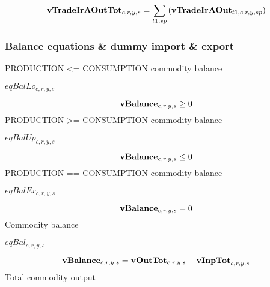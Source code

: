 \documentclass{article}
\begin{document}
\begin{dmath} 
{\bf vTradeIrAOutTot}_{c,r,y,s}  =  \sum_{t1,sp}{\left({\bf vTradeIrAOut}_{t1,c,r,y,sp}\right)}
\end{dmath} 
\subsubsection*{Balance equations \& dummy import \& export}
PRODUCTION <= CONSUMPTION commodity balance







$eqBalLo_{c,r,y,s}$





\begin{dmath} 
{\bf vBalance}_{c,r,y,s}  \ge  0
\end{dmath} 
PRODUCTION >= CONSUMPTION commodity balance







$eqBalUp_{c,r,y,s}$





\begin{dmath} 
{\bf vBalance}_{c,r,y,s}  \le  0
\end{dmath} 
PRODUCTION == CONSUMPTION commodity balance







$eqBalFx_{c,r,y,s}$





\begin{dmath} 
{\bf vBalance}_{c,r,y,s}  =  0
\end{dmath} 
Commodity balance







$eqBal_{c,r,y,s}$





\begin{dmath} 
{\bf vBalance}_{c,r,y,s}  =  {\bf vOutTot}_{c,r,y,s}-{\bf vInpTot}_{c,r,y,s}
\end{dmath} 
Total commodity output
\end{document}
